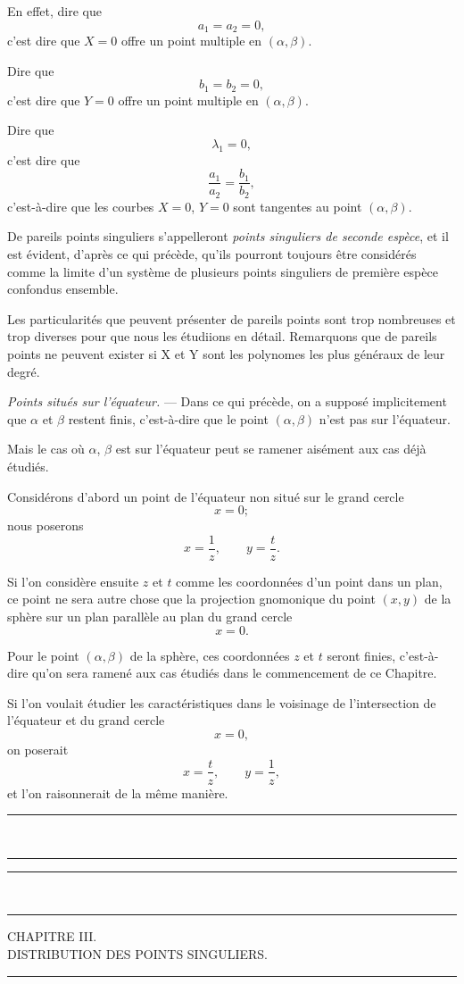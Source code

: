\documentclass[11pt]{article}
\newcommand{\ornament}{\begin{center}\rule{2.5em}{0.4pt}\,\raisebox{0.1ex}{\tiny$\bullet\bullet\bullet$}\,\rule{2.5em}{0.4pt}\end{center}}
\newcommand{\shortline}{\begin{center}\rule{3.5em}{0.4pt}\end{center}}
\begin{document}
En effet, dire que
\[
a_1=a_2=0,
\]
c’est dire que $X=0$ offre un point multiple en $(\alpha,\beta)$.

Dire que
\[
b_1=b_2=0,
\]
c’est dire que $Y=0$ offre un point multiple en $(\alpha,\beta)$.

Dire que
\[
\lambda_1=0,
\]
c’est dire que
\[
\frac{a_1}{a_2}=\frac{b_1}{b_2},
\]
c’est-à-dire que les courbes $X=0$, $Y=0$ sont tangentes au point $(\alpha,\beta)$.

De pareils points singuliers s’appelleront \emph{points singuliers de seconde espèce}, et il est évident, d’après ce qui précède, qu’ils pourront toujours être considérés comme la limite d’un système de plusieurs points singuliers de première espèce confondus ensemble.

Les particularités que peuvent présenter de pareils points sont trop nombreuses et trop diverses pour que nous les étudiions en détail. Remarquons que de pareils points ne peuvent exister si X et Y sont les polynomes les plus généraux de leur degré.

\emph{Points situés sur l’équateur.} --- Dans ce qui précède, on a supposé implicitement que $\alpha$ et $\beta$ restent finis, c’est-à-dire que le point $(\alpha,\beta)$ n’est pas sur l’équateur.

Mais le cas où $\alpha$, $\beta$ est sur l’équateur peut se ramener aisément aux cas déjà étudiés.

Considérons d’abord un point de l’équateur non situé sur le grand cercle
\[
x=0;
\]
nous poserons
\[
x=\frac1z,
\qquad
y=\frac{t}{z}.
\]

Si l’on considère ensuite $z$ et $t$ comme les coordonnées d’un point dans un plan, ce point ne sera autre chose que la projection gnomonique du point $(x,y)$ de la sphère sur un plan parallèle au plan du grand cercle
\[
x=0.
\]

Pour le point $(\alpha,\beta)$ de la sphère, ces coordonnées $z$ et $t$ seront finies, c’est-à-dire qu’on sera ramené aux cas étudiés dans le commencement de ce Chapitre.

Si l’on voulait étudier les caractéristiques dans le voisinage de l’intersection de l’équateur et du grand cercle
\[
x=0,
\]
on poserait
\[
x=\frac{t}{z},
\qquad
y=\frac1z,
\]
et l’on raisonnerait de la même manière.

\ornament


\ornament
\begin{center}
{\Large CHAPITRE III.}\\[0.4em]
{\small DISTRIBUTION DES POINTS SINGULIERS.}
\end{center}
\shortline
\end{document}
